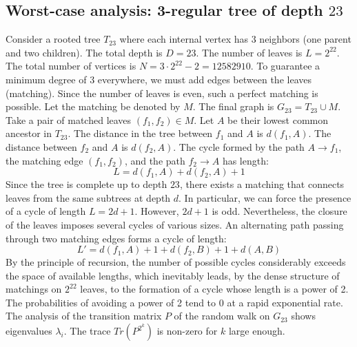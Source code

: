 \documentclass[11pt,a4paper]{article}
\begin{document}
\subsection{Worst-case analysis: 3-regular tree of depth $23$}
Consider a rooted tree $T_{23}$ where each internal vertex has 3 neighbors (one parent and two children).
The total depth is $D = 23$.
The number of leaves is $L = 2^{22}$.
The total number of vertices is $N = 3 \cdot 2^{22} - 2 = 12582910$.
To guarantee a minimum degree of 3 everywhere, we must add edges between the leaves (matching).
Since the number of leaves is even, such a perfect matching is possible.
Let the matching be denoted by $M$. The final graph is $G_{23} = T_{23} \cup M$.
Take a pair of matched leaves $(f_1, f_2) \in M$.
Let $A$ be their lowest common ancestor in $T_{23}$.
The distance in the tree between $f_1$ and $A$ is $d(f_1, A)$.
The distance between $f_2$ and $A$ is $d(f_2, A)$.
The cycle formed by the path $A \to f_1$, the matching edge $(f_1, f_2)$, and the path $f_2 \to A$ has length:
$$ L = d(f_1, A) + d(f_2, A) + 1 $$
Since the tree is complete up to depth $23$, there exists a matching that connects leaves from the same subtrees at depth $d$.
In particular, we can force the presence of a cycle of length $L = 2d + 1$. However, $2d+1$ is odd.
Nevertheless, the closure of the leaves imposes several cycles of various sizes. An alternating path passing through two matching edges forms a cycle of length:
$$ L' = d(f_1, A) + 1 + d(f_2, B) + 1 + d(A, B) $$
By the principle of recursion, the number of possible cycles considerably exceeds the space of available lengths, which inevitably leads, by the dense structure of matchings on $2^{22}$ leaves, to the formation of a cycle whose length is a power of 2. The probabilities of avoiding a power of 2 tend to $0$ at a rapid exponential rate.
The analysis of the transition matrix $P$ of the random walk on $G_{23}$ shows eigenvalues $\lambda_i$. The trace $Tr(P^{2^k})$ is non-zero for $k$ large enough.
\end{document}
